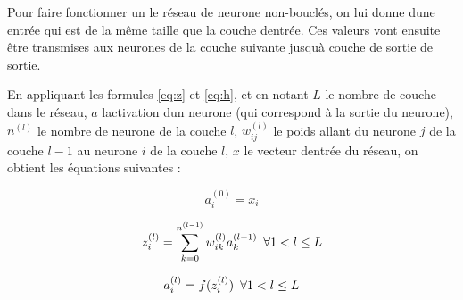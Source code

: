 \documentclass[11pt]{sdm}
\begin{document}
			Pour faire fonctionner un le r\'eseau de neurone non-boucl\'es, on lui donne d\textquotesingle une entr\'ee qui est de la m\^eme taille que la couche d\textquotesingle entr\'ee. Ces valeurs vont ensuite \^etre transmises aux neurones de la couche suivante jusqu\textquotesingle \`a couche de sortie de sortie.

			En appliquant les formules \ref{eq:z} et \ref{eq:h}, et en notant $L$ le nombre de couche dans le r\'eseau, $a$ l\textquotesingle activation d\textquotesingle un neurone (qui correspond \`a la sortie du neurone), $n^{(l)}$ le nombre de neurone de la couche $l$, $w_{ij}^{(l)}$ le poids allant du neurone $j$ de la couche $l-1$ au neurone $i$ de la couche $l$, $x$ le vecteur d\textquotesingle entr\'ee du r\'eseau, on obtient les \'equations suivantes :

			\begin{equation}
				a_i^{(0)} = x_i
				\label{eq:input}
			\end{equation}

			\begin{equation}
				z_i^{(l)} = \sum_{k=0}^{n^{(l-1)}} w_{ik}^{(l)} a_k^{(l-1)} \enskip \forall 1 < l \leq L
				\label{eq:zGlobal}
			\end{equation}

			\begin{equation}
				a_i^{(l)} = f(z_i^{(l)}) \enskip \forall 1 < l \leq L
				\label{eq:activation}
			\end{equation}
\end{document}
